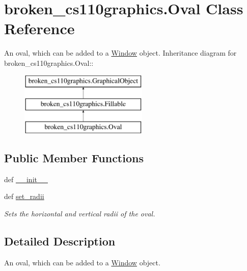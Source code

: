 \hypertarget{classbroken__cs110graphics_1_1Oval}{
\section{broken\_\-cs110graphics.Oval Class Reference}
\label{classbroken__cs110graphics_1_1Oval}
}


An oval, which can be added to a \hyperlink{classbroken__cs110graphics_1_1Window}{Window} object.  
Inheritance diagram for broken\_\-cs110graphics.Oval::\begin{figure}[H]
\begin{center}
\leavevmode
\includegraphics[height=3cm]{classbroken__cs110graphics_1_1Oval}
\end{center}
\end{figure}
\subsection*{Public Member Functions}
\begin{DoxyCompactItemize}
\item 
def \hyperlink{classbroken__cs110graphics_1_1Oval_a70f99a9cd217695d81b875b1cbc6e6f3}{\_\-\_\-init\_\-\_\-}
\item 
def \hyperlink{classbroken__cs110graphics_1_1Oval_aff3c410f0df668c90f99b7220d4e9053}{set\_\-radii}
\begin{DoxyCompactList}\small\item\em Sets the horizontal and vertical radii of the oval. \item\end{DoxyCompactList}\end{DoxyCompactItemize}


\subsection{Detailed Description}
An oval, which can be added to a \hyperlink{classbroken__cs110graphics_1_1Window}{Window} object. 

